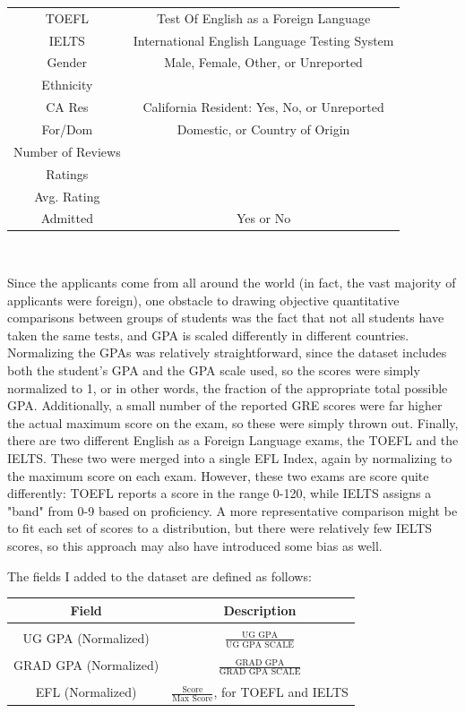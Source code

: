 \documentclass[]{article}
\begin{document}
\begin{tabular}{c|c}
		 TOEFL & Test Of English as a Foreign Language\\
		 IELTS & International English Language Testing System \\
		 Gender & Male, Female, Other, or Unreported\\
		 Ethnicity & \\
		 CA Res & California Resident: Yes, No, or Unreported\\
		 For/Dom & Domestic, or Country of Origin\\
		 Number of Reviews & \\ 
		 Ratings & \\ 
		 Avg. Rating & \\ 
		 Admitted & Yes or No\\
		\end{tabular} \\
		
		\par Since the applicants come from all around the world (in fact, the vast majority of applicants were foreign), one obstacle to drawing objective quantitative comparisons between groups of students was the fact that not all students have taken the same tests, and GPA is scaled differently in different countries. Normalizing the GPAs was relatively straightforward, since the dataset includes both the student's GPA and the GPA scale used, so the scores were simply normalized to 1, or in other words, the fraction of the appropriate total possible GPA. Additionally, a small number of the reported GRE scores were far higher the actual maximum score on the exam\cite{GRE}, so these were simply thrown out. Finally, there are two different English as a Foreign Language exams, the TOEFL\cite{TOEFL} and the IELTS\cite{IELTS}. These two were merged into a single EFL Index, again by normalizing to the maximum score on each exam. However, these two exams are score quite differently: TOEFL reports a score in the range 0-120, while IELTS assigns a "band" from 0-9 based on proficiency. A more representative comparison might be to fit each set of scores to a distribution, but there were relatively few IELTS scores, so this approach may also have introduced some bias as well. \\
		
		\par The fields I added to the dataset are defined as follows: \\
		
		\begin{tabular}{c|c}
		Field & Description \\ \hline \\
		UG GPA (Normalized) & $\frac {\text{UG GPA}}{\text{UG GPA SCALE}}$\\ \\
		GRAD GPA (Normalized) &  $\frac{\text{GRAD GPA}}{\text{GRAD GPA SCALE}}$\\ \\
		EFL (Normalized) & $\frac{\text{Score}}{\text{Max Score}}$, for TOEFL and IELTS\\		
		\end{tabular}
		
\end{document}
